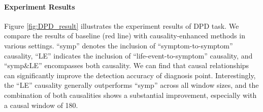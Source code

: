 \paragraph{Experiment Results}
Figure \ref{fig:DPD_result} illustrates the experiment results of DPD task. We compare the results of baseline (red line) with causality-enhanced methods in various settings. ``symp'' denotes the inclusion of ``symptom-to-symptom'' causality, ``LE'' indicates the inclusion of ``life-event-to-symptom'' causality, and ``symp\&LE'' encompasses both causality. We can find that causal relationships can significantly improve the detection accuracy of diagnosis point. Interestingly, the ``LE'' causality generally outperforms ``symp'' across all window sizes, and the combination of both causalities shows a substantial improvement, especially with a causal window of 180. 


